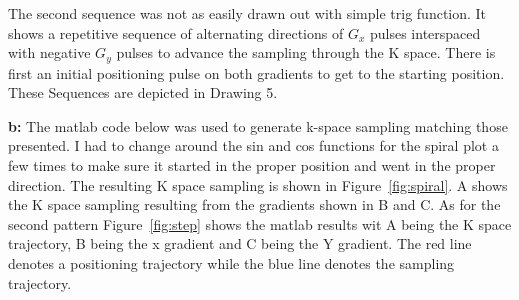 \documentclass[12pt]{article}
\begin{document}
The second sequence was not as easily drawn out with simple trig function. It shows a repetitive sequence of alternating directions of $G_x$ pulses interspaced with negative $G_y$ pulses to advance the sampling through the K space. There is first an initial positioning pulse on both gradients to get to the starting position. These Sequences are depicted in Drawing 5.

\noindent\textbf{b: }
The matlab code below was used to generate k-space sampling matching those presented. I had to change around the sin and cos functions for the spiral plot a few times to make sure it started in the proper position and went in the proper direction. The resulting K space sampling is shown in Figure~\ref{fig:spiral}. A shows the K space sampling resulting from the gradients shown in B and C. As for the second pattern Figure~\ref{fig:step} shows the matlab results wit A being the K space trajectory, B being the x gradient and C being the Y gradient. The red line denotes a positioning trajectory while the blue line denotes the sampling trajectory.
\end{document}
